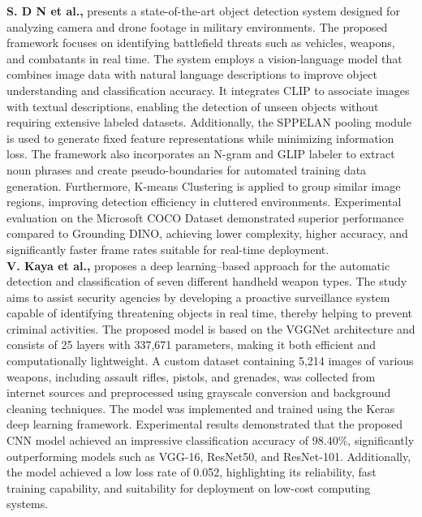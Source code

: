 \textbf{S. D N et al.,} presents a state-of-the-art object detection system designed for analyzing camera and drone footage in military environments. The proposed framework focuses on identifying battlefield threats such as vehicles, weapons, and combatants in real time. The system employs a vision-language model that combines image data with natural language descriptions to improve object understanding and classification accuracy. It integrates CLIP to associate images with textual descriptions, enabling the detection of unseen objects without requiring extensive labeled datasets. Additionally, the SPPELAN pooling module is used to generate fixed feature representations while minimizing information loss. The framework also incorporates an N-gram and GLIP labeler to extract noun phrases and create pseudo-boundaries for automated training data generation. Furthermore, K-means Clustering is applied to group similar image regions, improving detection efficiency in cluttered environments. Experimental evaluation on the Microsoft COCO Dataset demonstrated superior performance compared to Grounding DINO, achieving lower complexity, higher accuracy, and significantly faster frame rates suitable for real-time deployment. \textbf{\cite{supplementary_paper_8}} \\

\textbf{V. Kaya et al.,} proposes a deep learning–based approach for the automatic detection and classification of seven different handheld weapon types. The study aims to assist security agencies by developing a proactive surveillance system capable of identifying threatening objects in real time, thereby helping to prevent criminal activities. The proposed model is based on the VGGNet architecture and consists of 25 layers with 337,671 parameters, making it both efficient and computationally lightweight. A custom dataset containing 5,214 images of various weapons, including assault rifles, pistols, and grenades, was collected from internet sources and preprocessed using grayscale conversion and background cleaning techniques. The model was implemented and trained using the Keras deep learning framework. Experimental results demonstrated that the proposed CNN model achieved an impressive classification accuracy of 98.40\%, significantly outperforming models such as VGG-16, ResNet50, and ResNet-101. Additionally, the model achieved a low loss rate of 0.052, highlighting its reliability, fast training capability, and suitability for deployment on low-cost computing systems. \textbf{\cite{supplementary_paper_9}} \\

